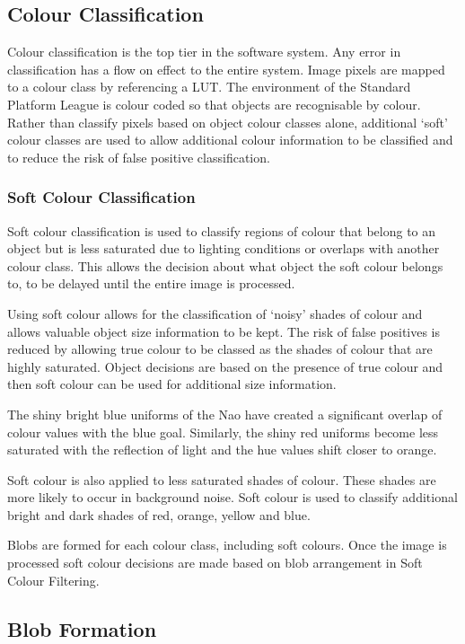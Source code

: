 \subsection{Colour Classification}

Colour classification is the top tier in the software system. Any error in classification has a flow on effect to the entire system. Image pixels are mapped to a colour class by referencing a LUT. The environment of the Standard Platform League is colour coded so that objects are recognisable by colour. Rather than classify pixels based on object colour classes alone, additional `soft' colour classes are used to allow additional colour information to be classified and to reduce the risk of false positive classification.

\subsubsection{Soft Colour Classification}

Soft colour classification is used to classify regions of colour that belong to an object but is less saturated due to lighting conditions or overlaps with another colour class. This allows the decision about what object the soft colour belongs to, to be delayed until the entire image is processed.

Using soft colour allows for the classification of `noisy' shades of colour and allows valuable object size information to be kept. The risk of false positives is reduced by allowing true colour to be classed as the shades of colour that are highly saturated. Object decisions are based on the presence of true colour and then soft colour can be used for additional size information.

The shiny bright blue uniforms of the Nao have created a significant overlap of colour values with the blue goal. Similarly, the shiny red uniforms become less saturated with the reflection of light and the hue values shift closer to orange.

Soft colour is also applied to less saturated shades of colour. These shades are more likely to occur in background noise. Soft colour is used to classify additional bright and dark shades of red, orange, yellow and blue. 
 
Blobs are formed for each colour class, including soft colours. Once the image is processed soft colour decisions are made based on blob arrangement in Soft Colour Filtering. 

\subsection{Blob Formation}

